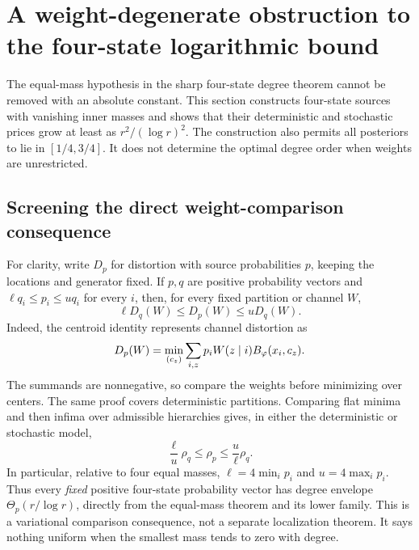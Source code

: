 \section{A weight-degenerate obstruction to the four-state logarithmic bound}
\label{sec:ext-weights}
The equal-mass hypothesis in the sharp four-state degree theorem cannot be
removed with an absolute constant. This section constructs four-state sources
with vanishing inner masses and shows that their deterministic and stochastic
prices grow at least as $r^2/(\log r)^2$. The construction also permits all
posteriors to lie in $[1/4,3/4]$. It does not determine the optimal degree order
when weights are unrestricted.

\subsection{Screening the direct weight-comparison consequence}
For clarity, write $D_p$ for distortion with source probabilities $p$, keeping
the locations and generator fixed. If $p,q$ are positive probability vectors
and $\ell q_i\le p_i\le u q_i$ for every $i$, then, for every fixed partition
or channel $W$,
\begin{equation}
 \ell D_q(W)\le D_p(W)\le uD_q(W).
 \label{eq:ext-weightcomparison}
\end{equation}
Indeed, the centroid identity represents channel distortion as
\[
 D_p(W)=\min_{(c_z)}\sum_{i,z}p_iW(z\mid i)B_\varphi(x_i,c_z).
\]
The summands are nonnegative, so compare the weights before minimizing over
centers. The same proof covers deterministic partitions. Comparing flat
minima and then infima over admissible hierarchies gives, in either the
deterministic or stochastic model,
\[
 \frac{\ell}{u}\rho_q\le\rho_p\le\frac{u}{\ell}\rho_q.
\]
In particular, relative to four equal masses, $\ell=4\min_i p_i$ and
$u=4\max_i p_i$. Thus every \emph{fixed} positive four-state probability vector
has degree envelope $\Theta_p(r/\log r)$, directly from the equal-mass theorem
and its lower family. This is a variational comparison consequence, not a
separate localization theorem. It says nothing uniform when the smallest
mass tends to zero with degree.

